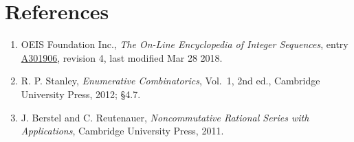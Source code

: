 \documentclass[11pt]{article}
\theoremstyle{definition}
\begin{document}
\section{References}

\begin{enumerate}

\item OEIS Foundation Inc., \emph{The On-Line Encyclopedia of Integer Sequences}, entry \href{https://oeis.org/A301906}{A301906}, revision 4, last modified Mar 28 2018.

\item R. P. Stanley, \emph{Enumerative Combinatorics}, Vol.~1, 2nd ed., Cambridge University Press, 2012; \S4.7.

\item J. Berstel and C. Reutenauer, \emph{Noncommutative Rational Series with Applications}, Cambridge University Press, 2011.

\end{enumerate}
\end{document}
